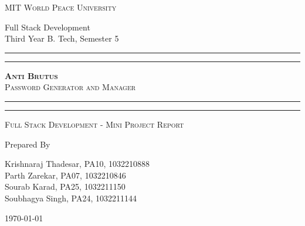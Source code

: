 \documentclass[11pt]{article}
\begin{document}
\begin{titlepage}
    \centering


    \huge\textsc{
        MIT World Peace University
    }\\

    \vspace{0.75\baselineskip} %

    \LARGE{
        Full Stack Development\\
        Third Year B. Tech, Semester 5
    }

    \vfill %


    \rule{\textwidth}{1.6pt}\vspace*{-\baselineskip}\vspace*{2pt}
    \rule{\textwidth}{0.6pt}
    \vspace{0.75\baselineskip} %

    \huge{\textsc{
            \textbf{Anti Brutus}\\
            Password Generator and Manager
        }} \\

    \vspace{0.5\baselineskip} %
    \rule{\textwidth}{0.6pt}\vspace*{-\baselineskip}\vspace*{2.8pt}
    \rule{\textwidth}{1.6pt}

    \vspace{1\baselineskip} %


    \LARGE\textsc{
        Full Stack Development - Mini Project Report
    } %
    \vfill


    Prepared By \vspace{0.5\baselineskip} %

    \Large{
        Krishnaraj Thadesar, PA10, 1032210888\\
        Parth Zarekar, PA07, 1032210846\\
        Sourab Karad, PA25, 1032211150\\
        Soubhagya Singh, PA24, 1032211144
    }

    \vspace{0.5\baselineskip} %
    \today

\end{titlepage}
\end{document}
